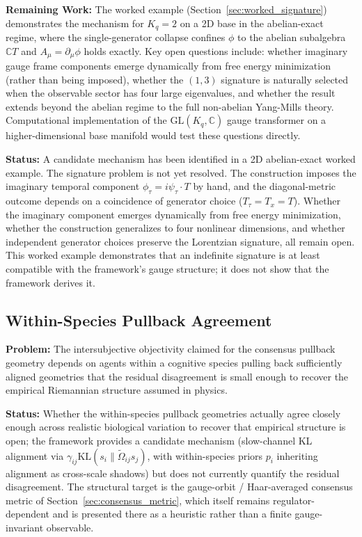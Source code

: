 \documentclass[11pt]{article}
\begin{document}
\textbf{Remaining Work:} The worked example (Section~\ref{sec:worked_signature}) demonstrates the mechanism for $K_q=2$ on a 2D base in the abelian-exact regime, where the single-generator collapse confines $\phi$ to the abelian subalgebra $\mathbb{C}T$ and $A_\mu = \partial_\mu \phi$ holds exactly. Key open questions include: whether imaginary gauge frame components emerge dynamically from free energy minimization (rather than being imposed), whether the $(1,3)$ signature is naturally selected when the observable sector has four large eigenvalues, and whether the result extends beyond the abelian regime to the full non-abelian Yang-Mills theory. Computational implementation of the $\mathrm{GL}(K_q, \mathbb{C})$ gauge transformer on a higher-dimensional base manifold would test these questions directly.

\textbf{Status:} A candidate mechanism has been identified in a 2D abelian-exact worked example. The signature problem is not yet resolved. The construction imposes the imaginary temporal component $\phi_\tau = i\psi_\tau \cdot T$ by hand, and the diagonal-metric outcome depends on a coincidence of generator choice ($T_\tau = T_x = T$). Whether the imaginary component emerges dynamically from free energy minimization, whether the construction generalizes to four nonlinear dimensions, and whether independent generator choices preserve the Lorentzian signature, all remain open. This worked example demonstrates that an indefinite signature is at least compatible with the framework's gauge structure; it does not show that the framework derives it.

\subsection{Within-Species Pullback Agreement}

\textbf{Problem:} The intersubjective objectivity claimed for the consensus pullback geometry depends on agents within a cognitive species pulling back sufficiently aligned geometries that the residual disagreement is small enough to recover the empirical Riemannian structure assumed in physics.

\textbf{Status:} Whether the within-species pullback geometries actually agree closely enough across realistic biological variation to recover that empirical structure is open; the framework provides a candidate mechanism (slow-channel KL alignment via $\gamma_{ij}\mathrm{KL}(s_i \| \tilde\Omega_{ij} s_j)$, with within-species priors $p_i$ inheriting alignment as cross-scale shadows) but does not currently quantify the residual disagreement. The structural target is the gauge-orbit / Haar-averaged consensus metric of Section~\ref{sec:consensus_metric}, which itself remains regulator-dependent and is presented there as a heuristic rather than a finite gauge-invariant observable.
\end{document}
